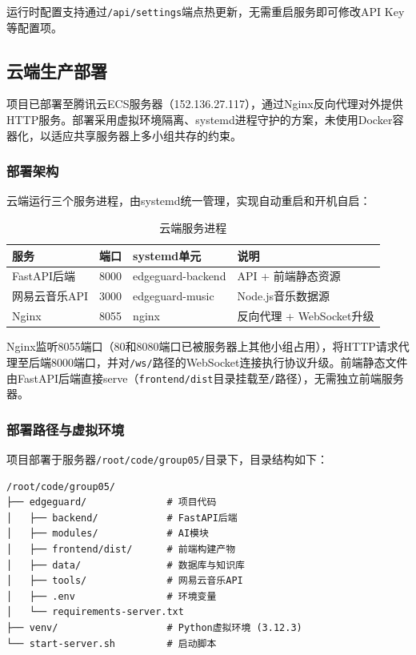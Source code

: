 \documentclass[a4paper]{article}
\begin{document}
运行时配置支持通过\texttt{/api/settings}端点热更新，无需重启服务即可修改API Key等配置项。

\subsection{云端生产部署}

项目已部署至腾讯云ECS服务器（152.136.27.117），通过Nginx反向代理对外提供HTTP服务。部署采用虚拟环境隔离、systemd进程守护的方案，未使用Docker容器化，以适应共享服务器上多小组共存的约束。

\subsubsection{部署架构}

云端运行三个服务进程，由systemd统一管理，实现自动重启和开机自启：

\begin{table}[H]
  \centering
  \caption{云端服务进程}
  \label{tab:cloud_services}
  \begin{tabular}{llll}
  \toprule
  服务 & 端口 & systemd单元 & 说明 \\
  \midrule
  FastAPI后端 & 8000 & edgeguard-backend & API + 前端静态资源 \\
  网易云音乐API & 3000 & edgeguard-music & Node.js音乐数据源 \\
  Nginx & 8055 & nginx & 反向代理 + WebSocket升级 \\
  \bottomrule
  \end{tabular}
\end{table}

Nginx监听8055端口（80和8080端口已被服务器上其他小组占用），将HTTP请求代理至后端8000端口，并对\texttt{/ws/}路径的WebSocket连接执行协议升级。前端静态文件由FastAPI后端直接serve（\texttt{frontend/dist}目录挂载至\texttt{/}路径），无需独立前端服务器。

\subsubsection{部署路径与虚拟环境}

项目部署于服务器\texttt{/root/code/group05/}目录下，目录结构如下：

\begin{verbatim}
/root/code/group05/
├── edgeguard/              # 项目代码
│   ├── backend/            # FastAPI后端
│   ├── modules/            # AI模块
│   ├── frontend/dist/      # 前端构建产物
│   ├── data/               # 数据库与知识库
│   ├── tools/              # 网易云音乐API
│   ├── .env                # 环境变量
│   └── requirements-server.txt
├── venv/                   # Python虚拟环境 (3.12.3)
└── start-server.sh         # 启动脚本
\end{verbatim}
\end{document}
